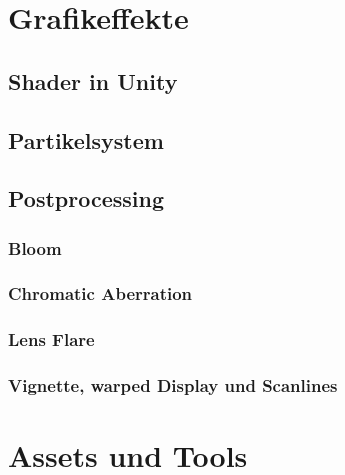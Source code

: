 \documentclass[a4paper,10pt,ngerman,fontsize=12pt]{scrreprt}
\begin{document}
\chapter{Grafikeffekte}




\section{Shader in Unity}

\lipsum[3]



\section{Partikelsystem}

\lipsum[3]



\section{Postprocessing}

\lipsum[3]



\subsection{Bloom}
\lipsum[3]



\subsection{Chromatic Aberration}

\lipsum[3]



\subsection{Lens Flare}

\lipsum[3]



\subsection{Vignette, warped Display und Scanlines}

\lipsum[3]





\chapter{Assets und Tools}
\end{document}
